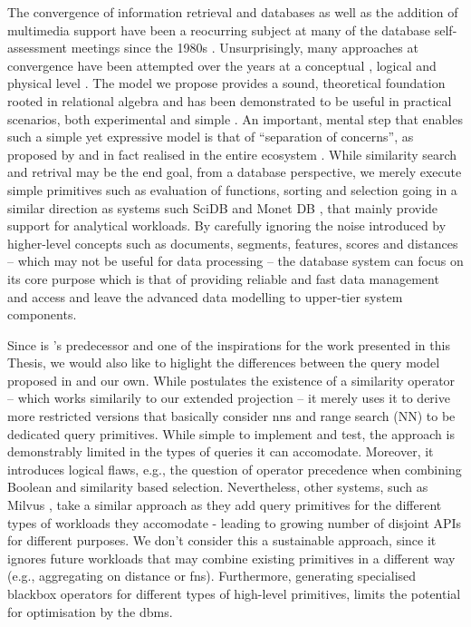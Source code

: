 The convergence of information retrieval and databases as well as the addition of multimedia support have been a reocurring subject at many of the database self-assessment meetings since the 1980s \cite{Agrawal:2008Claremont}. Unsurprisingly, many approaches at convergence have been attempted over the years at a conceptual \cite{Marcus:1996Foundations,Adjeroh:1997Multimedia,Watanabe:1998Multimedia}, logical \cite{Zhang:2006Boolean,Belohlavek:2007Relational} and physical level \cite{Silva:2010SimDB,Giangreco:2014Adam,Giangreco:2016Adam,Yang:2020Pase}. The model we propose provides a sound, theoretical foundation rooted in relational algebra and has been demonstrated to be useful in practical scenarios, both experimental \cite{Boerlin:20203d} and simple \cite{Rossetto2019:Retrieval,Sauter2020:Combining,Heller:2021Towards}. An important, mental step that enables such a simple yet expressive model is that of ``separation of concerns'', as proposed by \cite{Giangreco:2018Database} and in fact realised in the entire \vitrivr{} ecosystem \cite{Rossetto:2016Vitrivr,Gasser:2019Multimodal}. While similarity search and retrival may be the end goal, from a database perspective, we merely execute simple primitives such as evaluation of functions, sorting and selection going in a similar direction as systems such SciDB \cite{Stonebraker:2013SciDB} and Monet DB \cite{Idreos:2012MonetDB}, that mainly provide support for analytical workloads. By carefully ignoring the noise introduced by higher-level concepts such as documents, segments, features, scores and distances -- which may not be useful for data processing -- the database system can focus on its core purpose which is that of providing reliable and fast data management and access and leave the advanced data modelling to upper-tier system components.

Since \adampro \cite{Giangreco:2016Adam} is \cottontail{}'s predecessor and one of the inspirations for the work presented in this Thesis, we would also like to higlight the differences between the query model proposed in \cite{Giangreco:2018Database} and our own. While \cite{Giangreco:2018Database} postulates the existence of a similarity operator -- which works similarily to our extended projection -- it merely uses it to derive more restricted versions that basically consider \acrshort{nns} and range search (\epsilon NN) to be dedicated query primitives. While simple to implement and test, the approach is demonstrably limited in the types of queries it can accomodate. Moreover, it introduces logical flaws, e.g., the question of operator precedence when combining Boolean and similarity based selection. Nevertheless, other systems, such as Milvus \cite{Wang:2021Milvus}, take a similar approach as they add query primitives for the different types of workloads they accomodate - leading to growing number of disjoint APIs for different purposes. We don't consider this a sustainable approach, since it ignores future workloads that may combine existing primitives in a different way (e.g., aggregating on distance or \acrshort{fns}). Furthermore, generating specialised blackbox operators for different types of high-level primitives, limits the potential for optimisation by the \acrshort{dbms}. 

